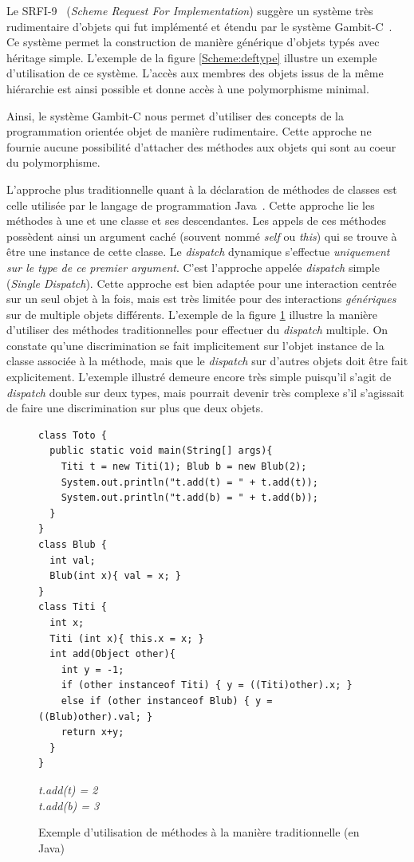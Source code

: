 \documentclass[12pt,twoside,letterpaper,francais]{book}
\begin{document}
Le SRFI-9~\cite{SRFI_9} (\textit{Scheme Request For Implementation})
suggère un système très rudimentaire d'objets qui fut implémenté et
étendu par le système Gambit-C~\cite{Gambit4}. Ce système permet la
construction de manière générique d'objets typés avec héritage
simple. L'exemple de la figure \ref{Scheme:deftype} illustre un
exemple d'utilisation de ce système. L'accès aux membres des objets
issus de la même hiérarchie est ainsi possible et donne accès à une
polymorphisme minimal.

Ainsi, le système Gambit-C nous permet d'utiliser des concepts de la
programmation orientée objet de manière rudimentaire. Cette approche
ne fournie aucune possibilité d'attacher des méthodes aux objets qui
sont au coeur du polymorphisme.

L'approche plus traditionnelle quant à la déclaration de méthodes de
classes est celle utilisée par le langage de programmation
Java~\cite{JavaSpec}. Cette approche lie les méthodes à une et une
classe et ses descendantes. Les appels de ces méthodes possèdent ainsi
un argument caché (souvent nommé \textit{self} ou \textit{this}) qui
se trouve à être une instance de cette classe. Le \textit{dispatch}
dynamique s'effectue \emph{uniquement sur le type de ce premier
  argument}. C'est l'approche appelée \textit{dispatch} simple
(\textit{Single Dispatch}). Cette approche est bien adaptée pour une
interaction centrée sur un seul objet à la fois, mais est très limitée
pour des interactions \emph{génériques} sur de multiple objets
différents. L'exemple de la figure \ref{OO:JavaDispatch} illustre la
manière d'utiliser des méthodes traditionnelles pour effectuer du
\textit{dispatch} multiple. On constate qu'une discrimination se fait
implicitement sur l'objet instance de la classe associée à la méthode,
mais que le \textit{dispatch} sur d'autres objets doit être fait
explicitement. L'exemple illustré demeure encore très simple puisqu'il
s'agit de \textit{dispatch} double sur deux types, mais pourrait
devenir très complexe s'il s'agissait de faire une discrimination sur
plus que deux objets.

\begin{figure}[h!]
  \begin{verbatim}
class Toto {
  public static void main(String[] args){
    Titi t = new Titi(1); Blub b = new Blub(2);
    System.out.println("t.add(t) = " + t.add(t));
    System.out.println("t.add(b) = " + t.add(b));
  }
} 
class Blub {
  int val;
  Blub(int x){ val = x; }
}
class Titi {
  int x;
  Titi (int x){ this.x = x; }
  int add(Object other){
    int y = -1;
    if (other instanceof Titi) { y = ((Titi)other).x; }
    else if (other instanceof Blub) { y = ((Blub)other).val; }
    return x+y;
  }
}
  \end{verbatim}
  {{\it
t.add(t) = 2\\
t.add(b) = 3
  }}
  \caption{Exemple d'utilisation de méthodes à la manière
    traditionnelle (en Java)}
  \label{OO:JavaDispatch}
\end{figure}
\end{document}
